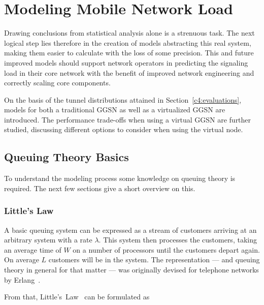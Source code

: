\section{Modeling Mobile Network Load}
\label{c4:modeling}

Drawing conclusions from statistical analysis alone is a strenuous task. The next logical step lies therefore in the creation of models abstracting this real system, making them easier to calculate with the loss of some precision. This and future improved models should support network operators in predicting the signaling load in their core network with the benefit of improved network engineering and correctly scaling core components.

On the basis of the tunnel distributions attained in Section~\ref{c4:evaluations}, models for both a traditional \gls{GGSN} as well as a virtualized \gls{GGSN} are introduced. The performance trade-offs when using a virtual \gls{GGSN} are further studied, discussing different options to consider when using the virtual node.



\subsection{Queuing Theory Basics}

To understand the modeling process some knowledge on queuing theory is required. The next few sections give a short overview on this.

\subsubsection{Little's Law}

A basic queuing system can be expressed as a stream of customers arriving at an arbitrary system with a rate $\lambda$. This system then processes the customers, taking an average time of $W$ on a number of processors until the customers depart again. On average $L$ customers will be in the system. The representation --- and queuing theory in general for that matter --- was originally devised for telephone networks by Erlang~\cite{erlang1917solution}.

From that, Little's~Law~\cite{little1961proof} can be formulated as

